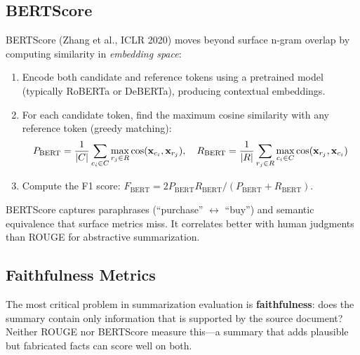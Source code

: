 \subsection{BERTScore}

BERTScore (Zhang et al., ICLR 2020) moves beyond surface n-gram overlap by
computing similarity in \emph{embedding space}:

\begin{enumerate}
    \item Encode both candidate and reference tokens using a pretrained model
          (typically RoBERTa or DeBERTa), producing contextual embeddings.
    \item For each candidate token, find the maximum cosine similarity with any
          reference token (greedy matching):
          \[
              P_{\text{BERT}} = \frac{1}{|C|}\sum_{c_i \in C}\max_{r_j \in R}\cos(\mathbf{x}_{c_i}, \mathbf{x}_{r_j}), \quad
              R_{\text{BERT}} = \frac{1}{|R|}\sum_{r_j \in R}\max_{c_i \in C}\cos(\mathbf{x}_{r_j}, \mathbf{x}_{c_i})
          \]
    \item Compute the F1 score: $F_{\text{BERT}} = 2 P_{\text{BERT}} R_{\text{BERT}} / (P_{\text{BERT}} + R_{\text{BERT}})$.
\end{enumerate}

BERTScore captures paraphrases (``purchase'' $\leftrightarrow$ ``buy'') and
semantic equivalence that surface metrics miss.  It correlates better with human
judgments than ROUGE for abstractive summarization.

\subsection{Faithfulness Metrics}
\label{sec:faithfulness}

The most critical problem in summarization evaluation is \textbf{faithfulness}:
does the summary contain only information that is supported by the source
document?  Neither ROUGE nor BERTScore measure this---a summary that adds
plausible but fabricated facts can score well on both.

